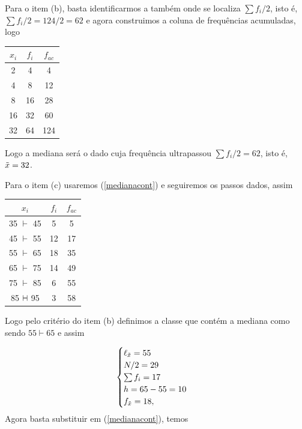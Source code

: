 \inic Para o item (b), basta identificarmos a também onde se localiza $\sum f_i/2$, isto é, $\sum f_i/2 = 124/2 = 62$ e agora construimos a coluna de frequências acumuladas, logo

\begin{table}[H]
    \centering
    \begin{tabular}{ccc}
	\hline
	$x_i$ & $f_i$ & $f_{ac}$\\
	\hline
	2 & 4 & 4\\
	4 & 8 & 12\\
	8 & 16 & 28\\
	16 & 32 & 60\\
	32 & 64 & 124\\
	\hline
    \end{tabular}
\end{table}
\inic Logo a mediana será o dado cuja frequência ultrapassou $\sum f_i/2 = 62$, isto é, $\Tilde{x} = 32$.

\inic Para o item (c) usaremos (\ref{medianacont}) e seguiremos os passos dados, assim 
\begin{table}[H]
    \centering
    \begin{tabular}{ccc}
	    \hline
	    $x_i$ & $f_i$ & $f_{ac}$\\
	    \hline
	    35 $\vdash$ 45 & 5 & 5\\
        45 $\vdash$ 55 & 12 & 17\\
	    55 $\vdash$ 65 & 18 & 35\\
        65 $\vdash$ 75 & 14 & 49\\
	    75 $\vdash$ 85 & 6 & 55\\
	    85 $\vdash \hspace{-0.2 cm }\dashv$ 95 & 3 & 58\\
	    \hline
    \end{tabular}
\end{table}

\inic Logo pelo critério do item (b)  definimos a classe que contém a mediana como sendo $55 \vdash 65$ e assim

\begin{equation*}
    \begin{cases}   
        \ell_{\Tilde{x}} = 55\\
        N/2 = 29\\
        \sum f_i = 17\\
        h = 65-55 = 10\\
        f_{\Tilde{x}} = 18,
    \end{cases}
\end{equation*}
Agora basta substituir em (\ref{medianacont}), temos

